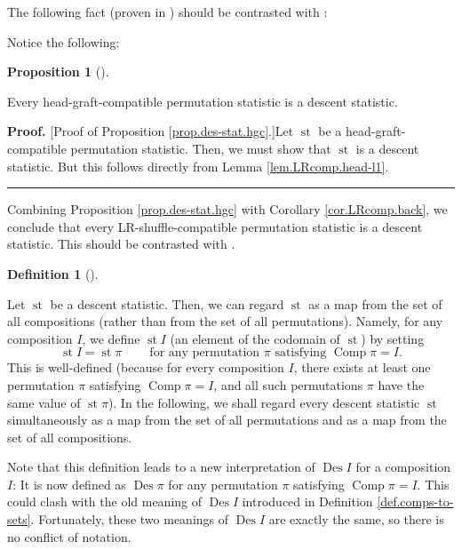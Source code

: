 \documentclass[numbers=enddot,12pt,final,onecolumn,notitlepage]{scrartcl}%
\theoremstyle{definition}
\newtheorem{prop}[theo]{Proposition}
\newenvironment{proposition}[1][]
{\begin{prop}[#1]\begin{leftbar}}
{\end{leftbar}\end{prop}}
\newtheorem{defi}[theo]{Definition}
\newenvironment{definition}[1][]
{\begin{defi}[#1]\begin{leftbar}}
{\end{leftbar}\end{defi}}
\newenvironment{proof}[1][Proof]{\noindent\textbf{#1.} }{\ \rule{0.5em}{0.5em}}
\newenvironment{verlong}{}{}
\newenvironment{vershort}{}{}
\begin{document}
\begin{vershort}
The following fact (proven in \cite{verlong}) should be contrasted with
\cite[Conjecture 6.11]{part1}:
\end{vershort}

\begin{verlong}
Notice the following:
\end{verlong}

\begin{proposition}
\label{prop.des-stat.hgc}Every head-graft-compatible permutation statistic is
a descent statistic.
\end{proposition}

\begin{verlong}
\begin{proof}
[Proof of Proposition \ref{prop.des-stat.hgc}.]Let $\operatorname*{st}$ be a
head-graft-compatible permutation statistic. Then, we must show that
$\operatorname*{st}$ is a descent statistic. But this follows directly from
Lemma \ref{lem.LRcomp.head-l1}.
\end{proof}

Combining Proposition \ref{prop.des-stat.hgc} with Corollary
\ref{cor.LRcomp.back}, we conclude that every LR-shuffle-compatible
permutation statistic is a descent statistic. This should be contrasted with
\cite[Conjecture 6.11]{part1}.
\end{verlong}

\begin{definition}
\label{def.des-stat.stI}Let $\operatorname*{st}$ be a descent statistic. Then,
we can regard $\operatorname*{st}$ as a map from the set of all compositions
(rather than from the set of all permutations). Namely, for any composition
$I$, we define $\operatorname*{st}I$ (an element of the codomain of
$\operatorname*{st}$) by setting%
\[
\operatorname*{st}I=\operatorname*{st}\pi\ \ \ \ \ \ \ \ \ \ \text{for any
permutation }\pi\text{ satisfying }\operatorname*{Comp}\pi=I.
\]
This is well-defined (because for every composition $I$, there exists at least
one permutation $\pi$ satisfying $\operatorname*{Comp}\pi=I$, and all such
permutations $\pi$ have the same value of $\operatorname*{st}\pi$). In the
following, we shall regard every descent statistic $\operatorname*{st}$
simultaneously as a map from the set of all permutations and as a map from the
set of all compositions.
\end{definition}

Note that this definition leads to a new interpretation of
$\operatorname*{Des}I$ for a composition $I$: It is now defined as
$\operatorname*{Des}\pi$ for any permutation $\pi$ satisfying
$\operatorname*{Comp}\pi=I$. This could clash with the old meaning of
$\operatorname*{Des}I$ introduced in Definition \ref{def.comps-to-sets}.
Fortunately, these two meanings of $\operatorname*{Des}I$ are exactly the
same, so there is no conflict of notation.
\end{document}
